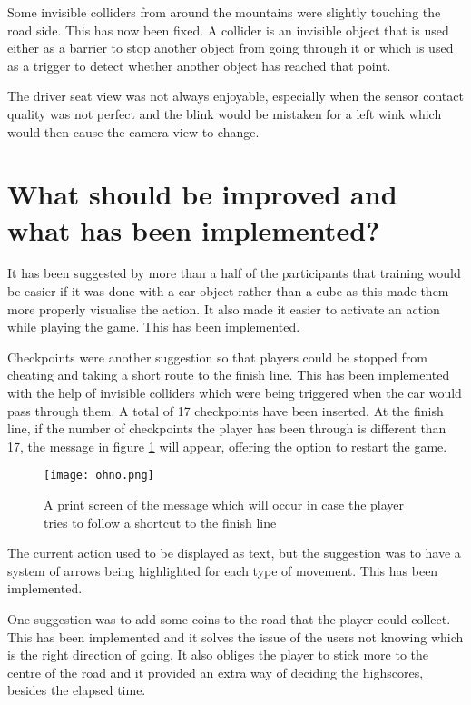 Some invisible colliders from around the mountains were slightly touching the road side. This has now been fixed. A collider is an invisible object that is used either as a barrier to stop another object from going through it or which is used as a trigger to detect whether another object has reached that point.

The driver seat view was not always enjoyable, especially when the sensor contact quality was not perfect and the blink would be mistaken for a left wink which would then cause the camera view to change.

\section{What should be improved and what has been implemented?}
\label{section:implemented}
It has been suggested by more than a half of the participants that training would be easier if it was done with a car object rather than a cube as this made them more properly visualise the action. It also made it easier to activate an action while playing the game. This has been implemented.

Checkpoints were another suggestion so that players could be stopped from cheating and taking a short route to the finish line. This has been implemented with the help of invisible colliders which were being triggered when the car would pass through them. A total of 17 checkpoints have been inserted. At the finish line, if the number of checkpoints the player has been through is different than 17, the message in figure \ref{fig:ohno} will appear, offering the option to restart the game.

\begin{figure}
  \centering
  \texttt{[image: ohno.png]}
  \caption{A print screen of the message which will occur in case the player tries to follow a shortcut to the finish line}
    \label{fig:ohno}        
\end{figure}

The current action used to be displayed as text, but the suggestion was to have a system of arrows being highlighted for each type of movement. This has been implemented.

One suggestion was to add some coins to the road that the player could collect. This has been implemented and it solves the issue of the users not knowing which is the right direction of going. It also obliges the player to stick more to the centre of the road and it provided an extra way of deciding the highscores, besides the elapsed time.  

